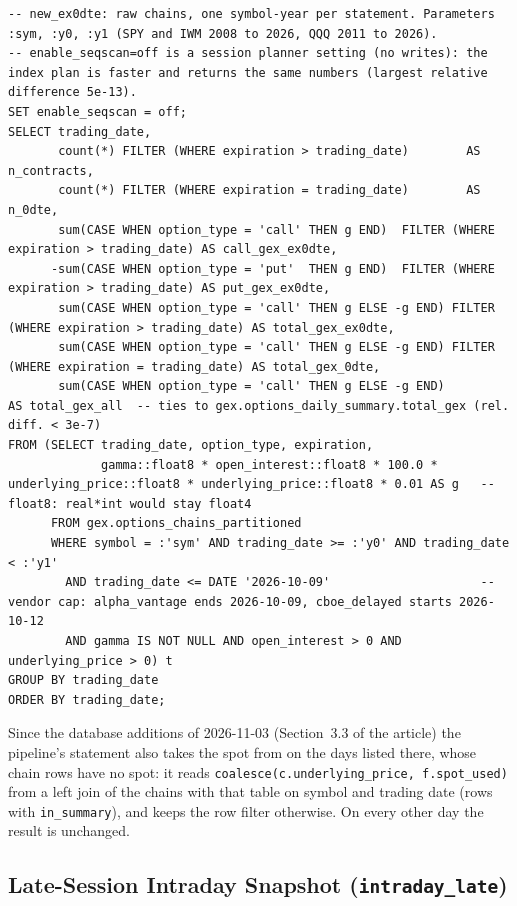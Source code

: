 \begin{lstlisting}[style=appcode]
-- new_ex0dte: raw chains, one symbol-year per statement. Parameters :sym, :y0, :y1 (SPY and IWM 2008 to 2026, QQQ 2011 to 2026).
-- enable_seqscan=off is a session planner setting (no writes): the index plan is faster and returns the same numbers (largest relative difference 5e-13).
SET enable_seqscan = off;
SELECT trading_date,
       count(*) FILTER (WHERE expiration > trading_date)        AS n_contracts,
       count(*) FILTER (WHERE expiration = trading_date)        AS n_0dte,
       sum(CASE WHEN option_type = 'call' THEN g END)  FILTER (WHERE expiration > trading_date) AS call_gex_ex0dte,
      -sum(CASE WHEN option_type = 'put'  THEN g END)  FILTER (WHERE expiration > trading_date) AS put_gex_ex0dte,
       sum(CASE WHEN option_type = 'call' THEN g ELSE -g END) FILTER (WHERE expiration > trading_date) AS total_gex_ex0dte,
       sum(CASE WHEN option_type = 'call' THEN g ELSE -g END) FILTER (WHERE expiration = trading_date) AS total_gex_0dte,
       sum(CASE WHEN option_type = 'call' THEN g ELSE -g END)                                          AS total_gex_all  -- ties to gex.options_daily_summary.total_gex (rel. diff. < 3e-7)
FROM (SELECT trading_date, option_type, expiration,
             gamma::float8 * open_interest::float8 * 100.0 * underlying_price::float8 * underlying_price::float8 * 0.01 AS g   -- float8: real*int would stay float4
      FROM gex.options_chains_partitioned
      WHERE symbol = :'sym' AND trading_date >= :'y0' AND trading_date < :'y1'
        AND trading_date <= DATE '2026-10-09'                     -- vendor cap: alpha_vantage ends 2026-10-09, cboe_delayed starts 2026-10-12
        AND gamma IS NOT NULL AND open_interest > 0 AND underlying_price > 0) t
GROUP BY trading_date
ORDER BY trading_date;
\end{lstlisting}

Since the database additions of 2026-11-03 (Section~3.3 of the article) the pipeline's statement also takes the spot from  on the days listed there, whose chain rows have no spot: it reads \texttt{coalesce(c.underlying\_price, f.spot\_used)} from a left join of the chains with that table on symbol and trading date (rows with \texttt{in\_summary}), and keeps the row filter otherwise. On every other day the result is unchanged.

\subsection{Late-Session Intraday Snapshot (\texttt{intraday\_late})}
\label{app:series:intraday}

